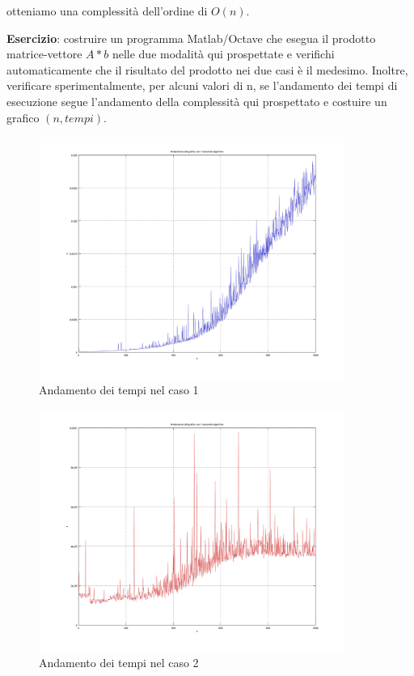 otteniamo una complessità dell'ordine di $O(n)$.
\newline

\textbf{Esercizio}: costruire un programma Matlab/Octave che esegua il prodotto matrice-vettore $A*b$ nelle due modalità qui prospettate e verifichi automaticamente che il risultato del prodotto nei due casi è il medesimo. Inoltre, verificare sperimentalmente, per alcuni valori di n, se l'andamento dei tempi di esecuzione segue l'andamento della complessità qui prospettato e costuire un grafico $(n, tempi)$.



\begin{figure}[H]
\centering
\includegraphics[width=100mm]{../Esercitazione3/images/esercizio1a.jpg}
\caption{Andamento dei tempi nel caso 1}
\label{overflow}
\end{figure}

\begin{figure}[H]
\centering
\includegraphics[width=100mm]{../Esercitazione3/images/esercizio1b.jpg}
\caption{Andamento dei tempi nel caso 2}
\label{overflow}
\end{figure}

